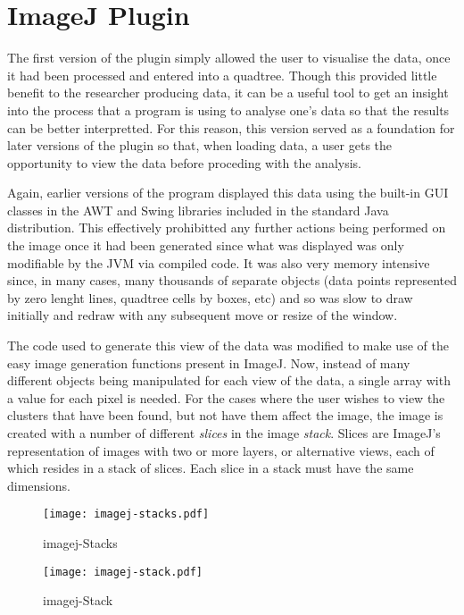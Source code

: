 
\section{ImageJ Plugin}
\label{sec:imagej_plugin}

The first version of the plugin simply allowed the user to visualise the data,
once it had been processed and entered into a quadtree. Though this provided
little benefit to the researcher producing data, it can be a useful tool to get
an insight into the process that a program is using to analyse one's data so
that the results can be better interpretted. For this reason, this version
served as a foundation for later versions of the plugin so that, when loading
data, a user gets the opportunity to view the data before proceding with the
analysis.

Again, earlier versions of the program displayed this data using the built-in
GUI classes in the AWT and Swing libraries included in the standard Java
distribution. This effectively prohibitted any further actions being performed
on the image once it had been generated since what was displayed was only
modifiable by the JVM via compiled code. It was also very memory intensive
since, in many cases, many thousands of separate objects (data points
represented by zero lenght lines, quadtree cells by boxes, etc) and so was slow
to draw initially and redraw with any subsequent move or resize of the window.

The code used to generate this view of the data was modified to make use of the
easy image generation functions present in ImageJ. Now, instead of many
different objects being manipulated for each view of the data, a single array
with a value for each pixel is needed. For the cases where the user wishes to
view the clusters that have been found, but not have them affect the image, the
image is created with a number of different \emph{slices} in the image
\emph{stack}. Slices are ImageJ's representation of images with two or more
layers, or alternative views, each of which resides in a stack of slices. Each
slice in a stack must have the same dimensions.

\begin{figure}[tbhp]
	\centering
	\texttt{[image: imagej-stacks.pdf]}
	\caption{imagej-Stacks}
	\label{fig:imagej-stacks}
\end{figure}

\begin{figure}[tbhp]
	\centering
	\texttt{[image: imagej-stack.pdf]}
	\caption{imagej-Stack}
	\label{fig:imagej-stack}
\end{figure}
